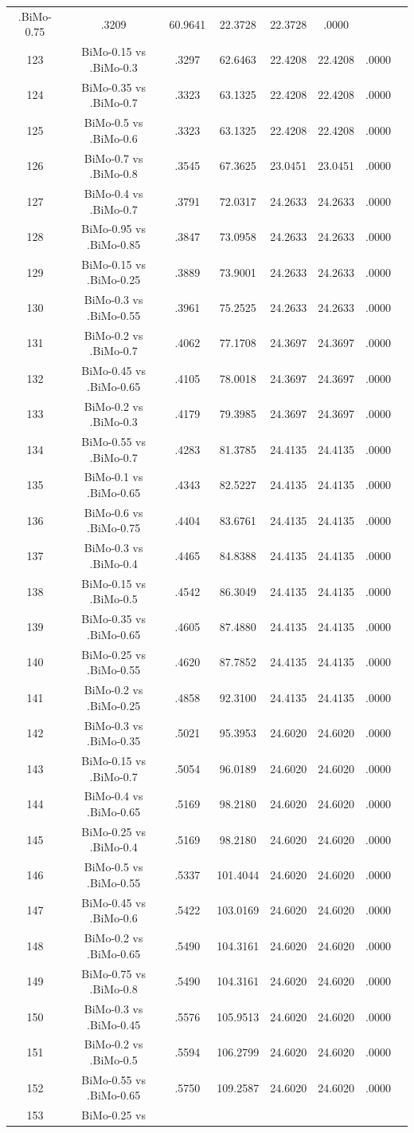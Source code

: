 \documentclass[a4paper,10pt]{article}
\begin{document}
\begin{landscape}
\begin{table}[!htp]
\begin{tabular}{cccccccc}
.BiMo-0.75&.3209&60.9641&22.3728&22.3728&.0000\\123&BiMo-0.15 vs .BiMo-0.3&.3297&62.6463&22.4208&22.4208&.0000\\124&BiMo-0.35 vs .BiMo-0.7&.3323&63.1325&22.4208&22.4208&.0000\\125&BiMo-0.5 vs .BiMo-0.6&.3323&63.1325&22.4208&22.4208&.0000\\126&BiMo-0.7 vs .BiMo-0.8&.3545&67.3625&23.0451&23.0451&.0000\\127&BiMo-0.4 vs .BiMo-0.7&.3791&72.0317&24.2633&24.2633&.0000\\128&BiMo-0.95 vs .BiMo-0.85&.3847&73.0958&24.2633&24.2633&.0000\\129&BiMo-0.15 vs .BiMo-0.25&.3889&73.9001&24.2633&24.2633&.0000\\130&BiMo-0.3 vs .BiMo-0.55&.3961&75.2525&24.2633&24.2633&.0000\\131&BiMo-0.2 vs .BiMo-0.7&.4062&77.1708&24.3697&24.3697&.0000\\132&BiMo-0.45 vs .BiMo-0.65&.4105&78.0018&24.3697&24.3697&.0000\\133&BiMo-0.2 vs .BiMo-0.3&.4179&79.3985&24.3697&24.3697&.0000\\134&BiMo-0.55 vs .BiMo-0.7&.4283&81.3785&24.4135&24.4135&.0000\\135&BiMo-0.1 vs .BiMo-0.65&.4343&82.5227&24.4135&24.4135&.0000\\136&BiMo-0.6 vs .BiMo-0.75&.4404&83.6761&24.4135&24.4135&.0000\\137&BiMo-0.3 vs .BiMo-0.4&.4465&84.8388&24.4135&24.4135&.0000\\138&BiMo-0.15 vs .BiMo-0.5&.4542&86.3049&24.4135&24.4135&.0000\\139&BiMo-0.35 vs .BiMo-0.65&.4605&87.4880&24.4135&24.4135&.0000\\140&BiMo-0.25 vs .BiMo-0.55&.4620&87.7852&24.4135&24.4135&.0000\\141&BiMo-0.2 vs .BiMo-0.25&.4858&92.3100&24.4135&24.4135&.0000\\142&BiMo-0.3 vs .BiMo-0.35&.5021&95.3953&24.6020&24.6020&.0000\\143&BiMo-0.15 vs .BiMo-0.7&.5054&96.0189&24.6020&24.6020&.0000\\144&BiMo-0.4 vs .BiMo-0.65&.5169&98.2180&24.6020&24.6020&.0000\\145&BiMo-0.25 vs .BiMo-0.4&.5169&98.2180&24.6020&24.6020&.0000\\146&BiMo-0.5 vs .BiMo-0.55&.5337&101.4044&24.6020&24.6020&.0000\\147&BiMo-0.45 vs .BiMo-0.6&.5422&103.0169&24.6020&24.6020&.0000\\148&BiMo-0.2 vs .BiMo-0.65&.5490&104.3161&24.6020&24.6020&.0000\\149&BiMo-0.75 vs .BiMo-0.8&.5490&104.3161&24.6020&24.6020&.0000\\150&BiMo-0.3 vs .BiMo-0.45&.5576&105.9513&24.6020&24.6020&.0000\\151&BiMo-0.2 vs .BiMo-0.5&.5594&106.2799&24.6020&24.6020&.0000\\152&BiMo-0.55 vs .BiMo-0.65&.5750&109.2587&24.6020&24.6020&.0000\\153&BiMo-0.25 vs 
\end{tabular}
\end{table}
\end{landscape}
\end{document}
